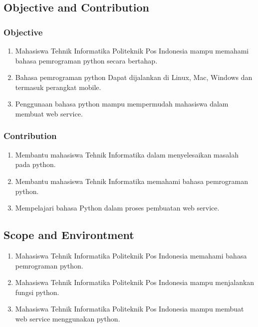 \subsection{Objective and Contribution}
	\subsubsection{Objective}
		\begin{enumerate}
			\item Mahasiswa Tehnik Informatika Politeknik Pos Indonesia mampu memahami bahasa pemrograman python secara bertahap.
			\item Bahasa pemrograman python Dapat dijalankan di Linux, Mac, Windows dan termasuk perangkat mobile.
			\item Penggunaan bahasa python mampu mempermudah mahasiswa dalam membuat web service.
		\end{enumerate}
	\subsubsection{Contribution}
		\begin{enumerate}
			\item Membantu mahasiswa Tehnik Informatika dalam menyelesaikan masalah pada python.
			\item Membantu mahasiswa Tehnik Informatika memahami bahasa pemrograman python.
			\item Mempelajari bahasa Python dalam proses pembuatan web service.
		\end{enumerate}
		
\subsection{Scope and Environtment}
	\begin{enumerate}
		\item Mahasiswa Tehnik Informatika Politeknik Pos Indonesia memahami bahasa pemrograman python.
		\item Mahasiswa Tehnik Informatika Politeknik Pos Indonesia mampu menjalankan fungsi python.
		\item Mahasiswa Tehnik Informatika Politeknik Pos Indonesia mampu membuat web service menggunakan python.
	\end{enumerate}